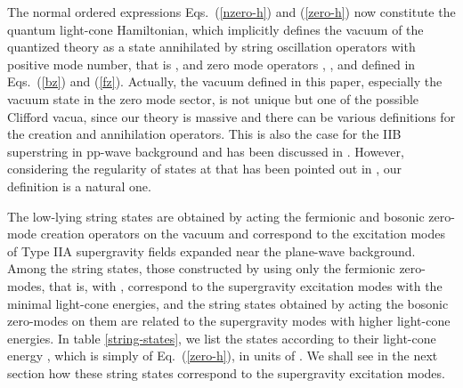 \documentclass[a4paper,12pt]{article}
\numberwithin{equation}{section}
\begin{document}
The normal ordered expressions Eqs.~(\ref{nzero-h}) and (\ref{zero-h})
now constitute the quantum light-cone Hamiltonian, which implicitly
defines the vacuum \myHighlight{$|0 \rangle$}\coordHE{} of the quantized theory as a state
annihilated by string oscillation operators with positive mode number,
that is \coordHE{}, and zero mode operators \coordHE{}, \myHighlight{$\chi$}\coordHE{}, and \coordHE{}
defined in Eqs.~(\ref{bz}) and (\ref{fz}).  Actually, the vacuum
defined in this paper, especially the vacuum state in the zero mode
sector, is not unique but one of the possible Clifford vacua, since
our theory is massive and there can be various definitions for the
creation and annihilation operators.  This is also the case for the
IIB superstring in pp-wave background and has been discussed in
\cite{met109}.  However, considering the regularity of states at \coordHE{} that has been pointed out in \cite{rus179}, our
definition is a natural one.

The low-lying string states are obtained by acting the fermionic and
bosonic zero-mode creation operators on the vacuum \myHighlight{$| 0 \rangle$}\coordHE{} and
correspond to the excitation modes of Type IIA supergravity fields
expanded near the plane-wave background.  Among the string states,
those constructed by using only the fermionic zero-modes, that is,
\coordHE{} with \coordHE{}, correspond to the supergravity excitation modes with the
minimal light-cone energies, and the string states obtained by acting
the bosonic zero-modes on them are related to the supergravity modes
with higher light-cone energies.  In table \ref{string-states}, we
list the states \coordHE{}
according to their light-cone energy \coordHE{}, which is simply \coordHE{}
of Eq.~(\ref{zero-h}), in units of \coordHE{}.  We shall see in the
next section how these string states correspond to the supergravity
excitation modes.
\end{document}
